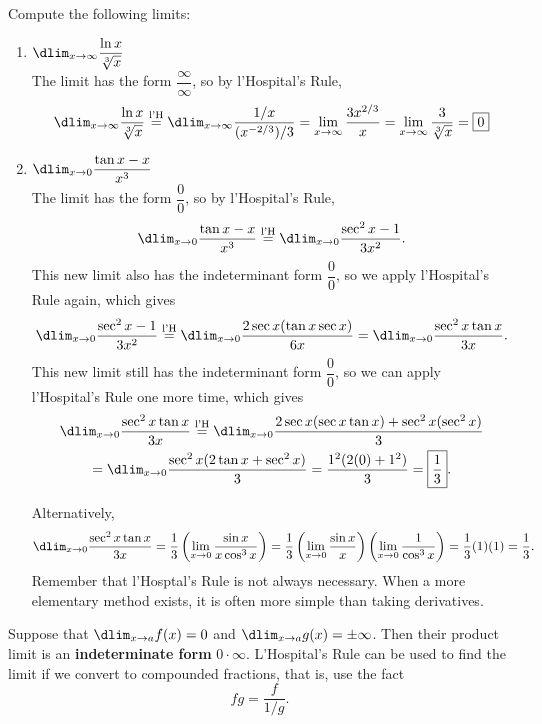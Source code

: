 \documentclass{book}
\newcommand{\lHeq}{\overset{\text{l'H}}{=}}
\begin{document}
\begin{Exam} Compute the following limits:
\begin{enumerate}
\item $\dlim_{x\to \infty} \dfrac{\ln x}{\sqrt[3]{x}}$\\

The limit has the form $\dfrac{\infty}{\infty}$, so by l'Hospital's Rule,
\[\dlim_{x\to \infty} \dfrac{\ln x}{\sqrt[3]{x}} \lHeq \dlim_{x\to \infty} \dfrac{1/x}{(x^{-2/3})/3} = \lim_{x\to \infty} \dfrac{3x^{2/3}}{x} = \lim_{x\to \infty} \dfrac{3}{\sqrt[3]{x}} = \fbox{$0$}\]

\item $\dlim_{x\to 0} \dfrac{\tan x - x}{x^3}$\\

The limit has the form $\dfrac{0}{0}$, so by l'Hospital's Rule,
\[\dlim_{x\to 0} \dfrac{\tan x - x}{x^3} \lHeq \dlim_{x\to 0} \dfrac{\sec^2 x- 1}{3x^2}.\] This new limit also has the indeterminant form $\dfrac{0}{0}$, so we apply l'Hospital's Rule again, which gives
\[\dlim_{x\to 0} \dfrac{\sec^2 x- 1}{3x^2} \lHeq \dlim_{x\to 0} \dfrac{2\sec x(\tan x\sec x)}{6x} = \dlim_{x\to 0} \dfrac{\sec^2 x\tan x}{3x}.\] This new limit still has the indeterminant form $\dfrac{0}{0}$, so we can apply l'Hospital's Rule one more time, which gives
\begin{multline*}\dlim_{x\to 0} \dfrac{\sec^2 x\tan x}{3x} \lHeq \dlim_{x\to 0} \dfrac{2\sec x(\sec x\tan x) + \sec^2 x(\sec^2 x)}{3}\\ = \dlim_{x\to 0} \dfrac{\sec^2 x(2\tan x + \sec^2 x)}{3} = \dfrac{1^2(2(0) + 1^2)}{3} = \fbox{$\dfrac{1}{3}$}.\end{multline*}\vs

Alternatively, \[\dlim_{x\to 0} \dfrac{\sec^2 x\tan x}{3x} = \dfrac{1}{3}\left(\lim_{x\to 0} \dfrac{\sin x}{x\cos^3 x}\right) = \dfrac{1}{3}\left(\lim_{x\to 0} \dfrac{\sin x}{x}\right)\left(\lim_{x\to 0} \dfrac{1}{\cos^3 x}\right) = \dfrac{1}{3}(1)(1) =  \dfrac{1}{3}.\] Remember that l'Hosptal's Rule is not always necessary. When a more elementary method exists, it is often more simple than taking derivatives. 
\end{enumerate}
\end{Exam}\vs

Suppose that $\dlim_{x\to a} f(x) = 0$ and $\dlim_{x\to a} g(x) = \pm\infty$. Then their product limit is an \textbf{indeterminate form} $0\cdot \infty$. L'Hospital's Rule can be used to find the limit if we convert to compounded fractions, that is, use the fact \[fg = \dfrac{f}{1/g}.\]
\end{document}
